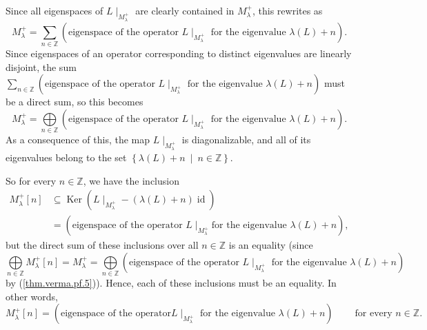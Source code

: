 \documentclass
[numbers=enddot,12pt,final,onecolumn,german,notitlepage]{scrartcl}%
\theoremstyle{definition}
\begin{document}
Since all eigenspaces of $L\mid_{M_{\lambda}^{+}}$ are clearly contained in
$M_{\lambda}^{+}$, this rewrites as%
\[
M_{\lambda}^{+}=\sum\limits_{n\in\mathbb{Z}}\left(  \text{eigenspace of the
operator }L\mid_{M_{\lambda}^{+}}\text{ for the eigenvalue }\lambda\left(
L\right)  +n\right)  .
\]
Since eigenspaces of an operator corresponding to distinct eigenvalues are
linearly disjoint, the sum $\sum\limits_{n\in\mathbb{Z}}\left(
\text{eigenspace of the operator }L\mid_{M_{\lambda}^{+}}\text{ for the
eigenvalue }\lambda\left(  L\right)  +n\right)  $ must be a direct sum, so
this becomes%
\begin{equation}
M_{\lambda}^{+}=\bigoplus\limits_{n\in\mathbb{Z}}\left(  \text{eigenspace of
the operator }L\mid_{M_{\lambda}^{+}}\text{ for the eigenvalue }\lambda\left(
L\right)  +n\right)  . \label{thm.verma.pf.5}%
\end{equation}
As a consequence of this, the map $L\mid_{M_{\lambda}^{+}}$ is diagonalizable,
and all of its eigenvalues belong to the set $\left\{  \lambda\left(
L\right)  +n\ \mid\ n\in\mathbb{Z}\right\}  $.

So for every $n\in\mathbb{Z}$, we have the inclusion%
\begin{align*}
M_{\lambda}^{+}\left[  n\right]   &  \subseteq\operatorname*{Ker}\left(
L\mid_{M_{\lambda}^{+}}-\left(  \lambda\left(  L\right)  +n\right)
\operatorname*{id}\right) \\
&  =\left(  \text{eigenspace of the operator }L\mid_{M_{\lambda}^{+}}\text{
for the eigenvalue }\lambda\left(  L\right)  +n\right)  ,
\end{align*}
but the direct sum of these inclusions over all $n\in\mathbb{Z}$ is an
equality (since%
\[
\bigoplus\limits_{n\in\mathbb{Z}}M_{\lambda}^{+}\left[  n\right]  =M_{\lambda
}^{+}=\bigoplus\limits_{n\in\mathbb{Z}}\left(  \text{eigenspace of the
operator }L\mid_{M_{\lambda}^{+}}\text{ for the eigenvalue }\lambda\left(
L\right)  +n\right)
\]
by (\ref{thm.verma.pf.5})). Hence, each of these inclusions must be an
equality. In other words,
\begin{equation}
M_{\lambda}^{+}\left[  n\right]  =\left(  \text{eigenspace of the operator
}L\mid_{M_{\lambda}^{+}}\text{ for the eigenvalue }\lambda\left(  L\right)
+n\right)  \ \ \ \ \ \ \ \ \ \ \text{for every }n\in\mathbb{Z}.
\label{thm.verma.pf.6}%
\end{equation}
\end{document}
